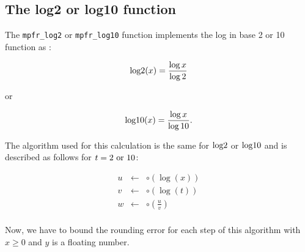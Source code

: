 \documentclass[12pt]{amsart}
\def\n{\textnormal}
\begin{document}
\subsection{The log2 or log10 function}

The {\tt mpfr\_log2} or {\tt mpfr\_log10} function implements the log in base 2 or 10 function  as :

\[
\textnormal{log2} (x) = \frac{\log{x}}{\log{2}}
\]

or

\[
\textnormal{log10} (x) = \frac{\log{x}}{\log{10}}.
\]


The algorithm used for this calculation is the same for $\n{log2}$ or
$\n{log10}$ and is described as follows for $t=2 \n{ or } 10$:

\begin{eqnarray}\nonumber
u&\leftarrow&\circ(\log(x))\\\nonumber
v&\leftarrow&\circ(\log(t))\\\nonumber
w&\leftarrow&\circ(\frac{u}{v})\\\nonumber
\end{eqnarray}

Now, we have to bound the rounding error for each step of this
algorithm with $x \geq 0$ and $y$ is a floating number.
\end{document}

